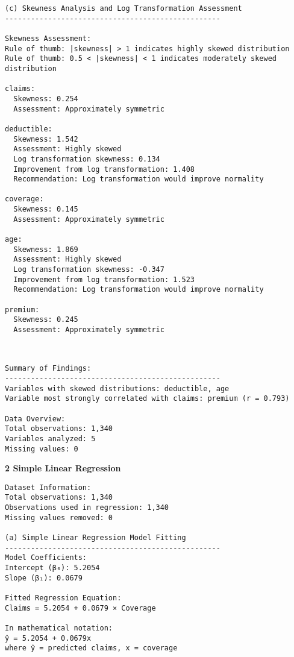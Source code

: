 \documentclass[8pt, twocolumn]{extarticle}
\begin{document}
    \begin{Verbatim}[commandchars=\\\{\}]
(c) Skewness Analysis and Log Transformation Assessment
--------------------------------------------------

Skewness Assessment:
Rule of thumb: |skewness| > 1 indicates highly skewed distribution
Rule of thumb: 0.5 < |skewness| < 1 indicates moderately skewed distribution

claims:
  Skewness: 0.254
  Assessment: Approximately symmetric

deductible:
  Skewness: 1.542
  Assessment: Highly skewed
  Log transformation skewness: 0.134
  Improvement from log transformation: 1.408
  Recommendation: Log transformation would improve normality

coverage:
  Skewness: 0.145
  Assessment: Approximately symmetric

age:
  Skewness: 1.869
  Assessment: Highly skewed
  Log transformation skewness: -0.347
  Improvement from log transformation: 1.523
  Recommendation: Log transformation would improve normality

premium:
  Skewness: 0.245
  Assessment: Approximately symmetric
    \end{Verbatim}
    \begin{center}
    \end{center}
    { \hspace*{\fill} \\}
    \begin{Verbatim}[commandchars=\\\{\}]
Summary of Findings:
--------------------------------------------------
Variables with skewed distributions: deductible, age
Variable most strongly correlated with claims: premium (r = 0.793)

Data Overview:
Total observations: 1,340
Variables analyzed: 5
Missing values: 0
    \end{Verbatim}
    \textbf{2 Simple Linear Regression}
    \begin{Verbatim}[commandchars=\\\{\}]
Dataset Information:
Total observations: 1,340
Observations used in regression: 1,340
Missing values removed: 0

(a) Simple Linear Regression Model Fitting
--------------------------------------------------
Model Coefficients:
Intercept (β₀): 5.2054
Slope (β₁): 0.0679

Fitted Regression Equation:
Claims = 5.2054 + 0.0679 × Coverage

In mathematical notation:
ŷ = 5.2054 + 0.0679x
where ŷ = predicted claims, x = coverage
    \end{Verbatim}
\end{document}
